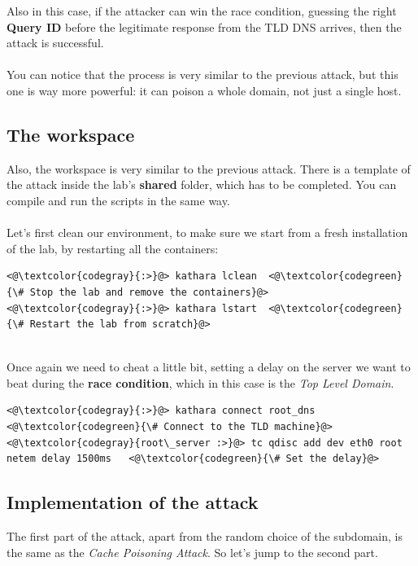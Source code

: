 \documentclass[11pt,a4paper]{article}
\begin{document}
\noindent
Also in this case, if the attacker can win the race condition, guessing the right
\textbf{Query ID} before the legitimate response from the TLD DNS arrives, then the attack
is successful.
\\
\\
\noindent
You can notice that the process is very similar to the previous attack, but this one
is way more powerful: it can poison a whole domain, not just a single host.

\subsection{The workspace}

Also, the workspace is very similar to the previous attack. There is a template of the
attack inside the lab's \textbf{shared} folder, which has to be completed. You can
compile and run the scripts in the same way.
\\
\\
\noindent
Let's first clean our environment, to make sure we start from a fresh installation of
the lab, by restarting all the containers:

\begin{lstlisting}
<@\textcolor{codegray}{:>}@> kathara lclean  <@\textcolor{codegreen}{\# Stop the lab and remove the containers}@>
<@\textcolor{codegray}{:>}@> kathara lstart  <@\textcolor{codegreen}{\# Restart the lab from scratch}@>
\end{lstlisting}

\noindent
\\
Once again we need to cheat a little bit, setting a delay on the server we want to beat
during the \textbf{race condition}, which in this case is the \emph{Top Level Domain}.

\begin{lstlisting}
<@\textcolor{codegray}{:>}@> kathara connect root_dns                       <@\textcolor{codegreen}{\# Connect to the TLD machine}@>
<@\textcolor{codegray}{root\_server :>}@> tc qdisc add dev eth0 root netem delay 1500ms   <@\textcolor{codegreen}{\# Set the delay}@>
\end{lstlisting}

\subsection{Implementation of the attack}

The first part of the attack, apart from the random choice of the subdomain, is the same
as the \emph{Cache Poisoning Attack}. So let's jump to the second part.
\end{document}
